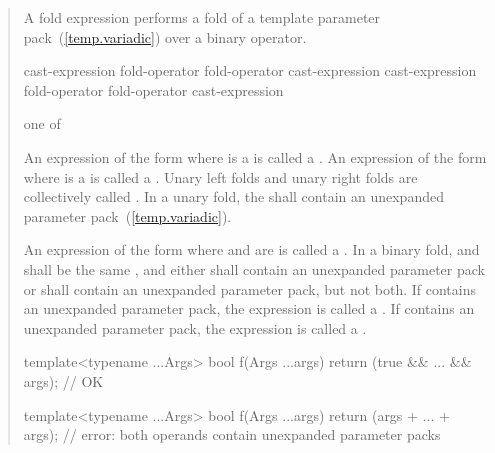 \begin{quote}

\pnum
A fold expression performs a fold of a template parameter
pack~(\ref{temp.variadic}) over a binary operator.

\begin{bnf}
\br
    \terminal{(} cast-expression fold-operator  \terminal{)}\br
    \terminal{(}  fold-operator cast-expression \terminal{)}\br
    \terminal{(} cast-expression fold-operator  fold-operator cast-expression \terminal{)}
\end{bnf}

\begin{bnf}
 \textnormal{one of}\br
    \terminal{+ }\quad\terminal{- }\quad\terminal{* }\quad\terminal{/ }\quad\terminal{\% }\quad\terminal{\^{} }\quad\terminal{\& }\quad\terminal{| }\quad\terminal{\shl\ }\quad\terminal{\shr }\br
    \terminal{+=}\quad\terminal{-=}\quad\terminal{*=}\quad\terminal{/=}\quad\terminal{\%=}\quad\terminal{\^{}=}\quad\terminal{\&=}\quad\terminal{|=}\quad\terminal{\shl=}\quad\terminal{\shr=}\quad\terminal{=}\br
    \terminal{==}\quad\terminal{!=}\quad\terminal{< }\quad\terminal{> }\quad\terminal{<=}\quad\terminal{>=}\quad\terminal{\&\&}\quad\terminal{||}\quad\terminal{,  }\quad{}\quad\terminal{->*}
\end{bnf}

\pnum
An expression of the form
  
where  is a 
is called a .
An expression of the form
  
where  is a 
is called a .
Unary left folds and unary right folds
are collectively called .
In a unary fold,
the 
shall contain an unexpanded parameter pack~(\ref{temp.variadic}).

\pnum
An expression of the form
    
where  and  are 
is called a .
In a binary fold,
 and 
shall be the same ,
and either 
shall contain an unexpanded parameter pack
or 
shall contain an unexpanded parameter pack,
but not both.
If  contains an unexpanded parameter pack,
the expression is called a .
If  contains an unexpanded parameter pack,
the expression is called a .
\enterexample
\begin{codeblock}
template<typename ...Args>
bool f(Args ...args) {
  return (true && ... && args); // OK
}

template<typename ...Args>
bool f(Args ...args) {
  return (args + ... + args); // error: both operands contain unexpanded parameter packs
}
\end{codeblock}
\exitexample

\end{quote}


